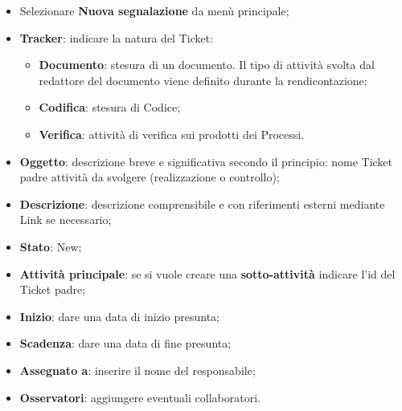 \label{sec:realizzazioneControllo}
		\begin{itemize}
		
		\item Selezionare \textbf{Nuova segnalazione} da menù principale; 
		\item \textbf{Tracker}: indicare la natura del Ticket: 
		\begin{itemize}
	\item \textbf{Documento}: stesura di un documento. Il tipo di attività svolta dal redattore del documento viene definito durante la rendicontazione; 
	\item \textbf{Codifica}: stesura di Codice; 
	\item \textbf{Verifica}: attività di verifica sui prodotti dei Processi. 

	\end{itemize}

\item \textbf{Oggetto}: descrizione breve e significativa secondo il principio: nome Ticket padre attività da svolgere (realizzazione o controllo); 
\item \textbf{Descrizione}: descrizione comprensibile e con riferimenti esterni mediante Link se 
necessario; 

\item \textbf{Stato}: New; 
\item \textbf{Attività principale}: se si vuole creare una \textbf{sotto-attività} indicare l’id del Ticket 
padre; 
\item \textbf{Inizio}: dare una data di inizio presunta; 
\item \textbf{Scadenza}: dare una data di fine presunta; 
\item \textbf{Assegnato a}: inserire il nome del responsabile; 
\item \textbf{Osservatori}: aggiungere eventuali collaboratori. 
\end{itemize} 

\label{sec:TicketVerifica}

